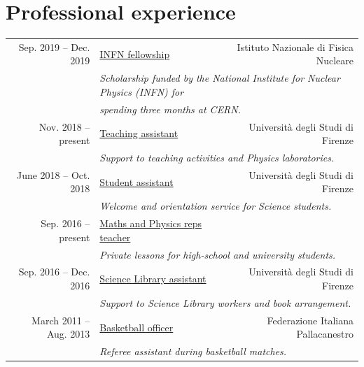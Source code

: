 \documentclass[a4, 11pt]{report}
\begin{document}
    \section*{Professional experience}
        \begin{tabular*}{\textwidth}{rl @{\extracolsep{\fill}} r}
            {\small Sep. 2019 -- Dec. 2019} & \ul{INFN fellowship} & {\small Istituto Nazionale di Fisica Nucleare}\\
            & \multicolumn{2}{l}{\small \emph {Scholarship funded by the National Institute for Nuclear Physics (INFN) for}}\\
            & \multicolumn{2}{l}{\small \emph{spending three months at CERN.}}\\ [3 mm]
        
            {\small Nov. 2018 -- present} & \ul{Teaching assistant} & {\small Università degli Studi di Firenze}\\
            & \multicolumn{2}{l}{\small \emph {Support to teaching activities and Physics laboratories.}}\\ [3 mm]
            
            {\small June 2018 -- Oct. 2018} & \ul{Student assistant} & {\small Università degli Studi di Firenze}\\
            & \multicolumn{2}{l}{\small \emph {Welcome and orientation service for Science students.}}\\ [3 mm]
            
            {\small Sep. 2016 -- present} & \underline{Maths and Physics reps teacher}\\
            & \multicolumn{2}{l}{\small \emph {Private lessons for high-school and university students.}}\\ [3 mm]
            
            {\small Sep. 2016 -- Dec. 2016} & \ul{Science Library assistant} & {\small Università degli Studi di Firenze}\\
            & \multicolumn{2}{l}{\small \emph {Support to Science Library workers and book arrangement.}}\\ [3 mm]
            
            {\small March 2011 -- Aug. 2013} & \ul{Basketball officer} & {\small Federazione Italiana Pallacanestro}\\
            & \multicolumn{2}{l}{\small \emph {Referee assistant during basketball matches.}}\\
        \end{tabular*}
    
\end{document}
